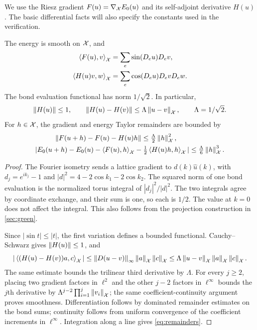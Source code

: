 We use the Riesz gradient $F(u)=\nabla_\mathcal XE_0(u)$ and its self-adjoint derivative $H(u)$. The basic differential facts will also specify the constants used in the verification.

\begin{lemma}\label{lem:basic}
The energy is smooth on $\mathcal X$, and
\begin{align}
 \left\langle F(u),v\right\rangle_\mathcal X&=\sum_e\sin(D_eu)D_ev,\label{eq:firstvar}\\
 \left\langle H(u)v,w\right\rangle_\mathcal X&=\sum_e\cos(D_eu)D_evD_ew.\label{eq:hessian}
\end{align}
The bond evaluation functional has norm $1/\sqrt2$. In particular,
\begin{equation}\label{eq:basic-bounds}
 \left\lVert H(u)\right\rVert\le1,\qquad
 \left\lVert H(u)-H(v)\right\rVert\le\Lambda\left\lVert u-v\right\rVert_\mathcal X,
 \qquad \Lambda=1/\sqrt2.
\end{equation}
For $h\in\mathcal X$, the gradient and energy Taylor remainders are bounded by
\begin{gather}\label{eq:remainders}
 \left\lVert F(u+h)-F(u)-H(u)h\right\rVert\le\tfrac\Lambda2\left\lVert h\right\rVert_\mathcal X^2,\qquad\qquad
 \nonumber\\
 |E_0(u+h)-E_0(u)-\left\langle F(u),h\right\rangle_\mathcal X
          -\tfrac12\left\langle H(u)h,h\right\rangle_\mathcal X|
       \le\tfrac\Lambda6\left\lVert h\right\rVert_\mathcal X^3.
\end{gather}
\end{lemma}
\begin{proof}
The Fourier isometry sends a lattice gradient to $d(k)\widehat u(k)$, with $d_j=e^{ik_j}-1$ and $|d|^2=4-2\cos k_1-2\cos k_2$. The squared norm of one bond evaluation is the normalized torus integral of $|d_j|^2/|d|^2$. The two integrals agree by coordinate exchange, and their sum is one, so each is $1/2$. The value at $k=0$ does not affect the integral. This also follows from the projection construction in \cref{sec:green}.

Since $|\sin t|\le|t|$, the first variation defines a bounded functional. Cauchy--Schwarz gives $\left\lVert H(u)\right\rVert\le1$, and
\[
 |\left\langle(H(u)-H(v))a,c\right\rangle_\mathcal X|
 \le\left\lVert D(u-v)\right\rVert_\infty\left\lVert a\right\rVert_\mathcal X\left\lVert c\right\rVert_\mathcal X
 \le\Lambda\left\lVert u-v\right\rVert_\mathcal X\left\lVert a\right\rVert_\mathcal X\left\lVert c\right\rVert_\mathcal X.
\]
The same estimate bounds the trilinear third derivative by $\Lambda$. For every $j\ge2$, placing two gradient factors in $\ell^2$ and the other $j-2$ factors in $\ell^\infty$ bounds the $j$th derivative by $\Lambda^{j-2}\prod_{i=1}^j\left\lVert v_i\right\rVert_\mathcal X$; the same coefficient-continuity argument proves smoothness. Differentiation follows by dominated remainder estimates on the bond sums; continuity follows from uniform convergence of the coefficient increments in $\ell^\infty$. Integration along a line gives \cref{eq:remainders}.
\end{proof}

